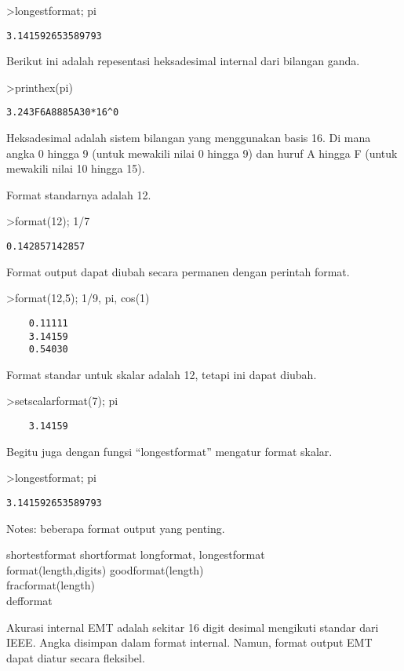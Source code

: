 \documentclass[
]{book}
\begin{document}
\textgreater longestformat; pi

\begin{verbatim}
3.141592653589793
\end{verbatim}

Berikut ini adalah repesentasi heksadesimal internal dari bilangan ganda.

\textgreater printhex(pi)

\begin{verbatim}
3.243F6A8885A30*16^0
\end{verbatim}

Heksadesimal adalah sistem bilangan yang menggunakan basis 16. Di mana angka 0 hingga 9 (untuk mewakili nilai 0 hingga 9) dan huruf A hingga F (untuk mewakili nilai 10 hingga 15).

Format standarnya adalah 12.

\textgreater format(12); 1/7

\begin{verbatim}
0.142857142857
\end{verbatim}

Format output dapat diubah secara permanen dengan perintah format.

\textgreater format(12,5); 1/9, pi, cos(1)

\begin{verbatim}
    0.11111 
    3.14159 
    0.54030 
\end{verbatim}

Format standar untuk skalar adalah 12, tetapi ini dapat diubah.

\textgreater setscalarformat(7); pi

\begin{verbatim}
    3.14159 
\end{verbatim}

Begitu juga dengan fungsi ``longestformat'' mengatur format skalar.

\textgreater longestformat; pi

\begin{verbatim}
3.141592653589793
\end{verbatim}

Notes: beberapa format output yang penting.

shortestformat shortformat longformat, longestformat\\
format(length,digits) goodformat(length)\\
fracformat(length)\\
defformat

Akurasi internal EMT adalah sekitar 16 digit desimal mengikuti standar dari IEEE. Angka disimpan dalam format internal. Namun, format output EMT dapat diatur secara fleksibel.
\end{document}
